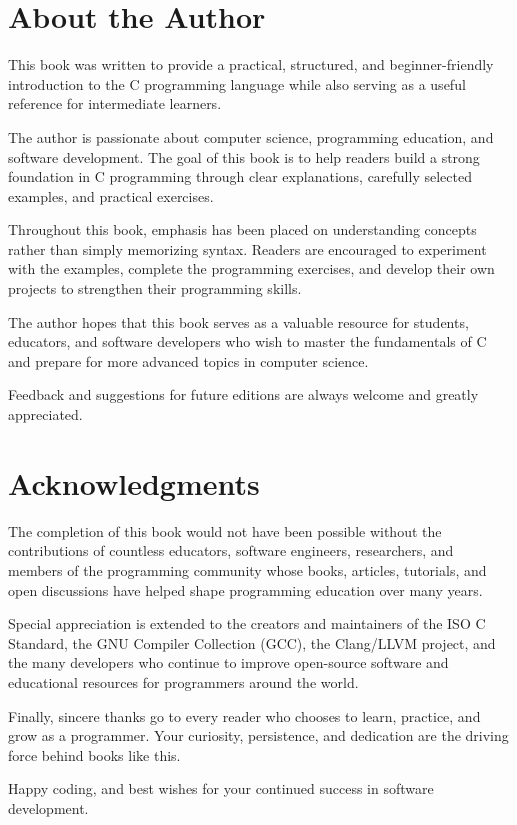 \documentclass[12pt,openany]{book}
\begin{document}
\chapter{About the Author}

This book was written to provide a practical, structured, and beginner-friendly introduction to the C programming language while also serving as a useful reference for intermediate learners.

The author is passionate about computer science, programming education, and software development. The goal of this book is to help readers build a strong foundation in C programming through clear explanations, carefully selected examples, and practical exercises.

Throughout this book, emphasis has been placed on understanding concepts rather than simply memorizing syntax. Readers are encouraged to experiment with the examples, complete the programming exercises, and develop their own projects to strengthen their programming skills.

The author hopes that this book serves as a valuable resource for students, educators, and software developers who wish to master the fundamentals of C and prepare for more advanced topics in computer science.

Feedback and suggestions for future editions are always welcome and greatly appreciated.
\chapter{Acknowledgments}

The completion of this book would not have been possible without the contributions of countless educators, software engineers, researchers, and members of the programming community whose books, articles, tutorials, and open discussions have helped shape programming education over many years.

Special appreciation is extended to the creators and maintainers of the ISO C Standard, the GNU Compiler Collection (GCC), the Clang/LLVM project, and the many developers who continue to improve open-source software and educational resources for programmers around the world.

Finally, sincere thanks go to every reader who chooses to learn, practice, and grow as a programmer. Your curiosity, persistence, and dedication are the driving force behind books like this.

Happy coding, and best wishes for your continued success in software development.
\end{document}
